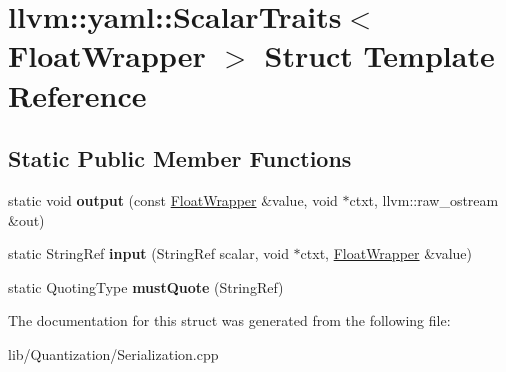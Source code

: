 \hypertarget{structllvm_1_1yaml_1_1_scalar_traits_3_01_float_wrapper_01_4}{}\section{llvm\+:\+:yaml\+:\+:Scalar\+Traits$<$ Float\+Wrapper $>$ Struct Template Reference}
\label{structllvm_1_1yaml_1_1_scalar_traits_3_01_float_wrapper_01_4}
\subsection*{Static Public Member Functions}
\begin{DoxyCompactItemize}
\item 
\mbox{\label{structllvm_1_1yaml_1_1_scalar_traits_3_01_float_wrapper_01_4_ac3c59ed02e67ad3c79855055a7b14882}} 
static void {\bfseries output} (const \hyperlink{structllvm_1_1yaml_1_1_float_wrapper}{Float\+Wrapper} \&value, void $\ast$ctxt, llvm\+::raw\+\_\+ostream \&out)
\item 
\mbox{\label{structllvm_1_1yaml_1_1_scalar_traits_3_01_float_wrapper_01_4_a9b7c0af51e1b3e88aeb046d6bb5a1e4f}} 
static String\+Ref {\bfseries input} (String\+Ref scalar, void $\ast$ctxt, \hyperlink{structllvm_1_1yaml_1_1_float_wrapper}{Float\+Wrapper} \&value)
\item 
\mbox{\label{structllvm_1_1yaml_1_1_scalar_traits_3_01_float_wrapper_01_4_ac36c852f1d0c76107183781f8ee2b218}} 
static Quoting\+Type {\bfseries must\+Quote} (String\+Ref)
\end{DoxyCompactItemize}


The documentation for this struct was generated from the following file\+:\begin{DoxyCompactItemize}
\item 
lib/\+Quantization/Serialization.\+cpp\end{DoxyCompactItemize}
